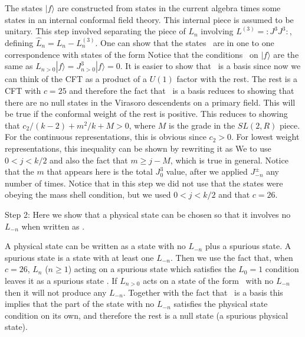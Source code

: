 The states
 $|f\rangle$ are constructed from states in the current algebra times
some states in an internal conformal field theory. This internal piece is
assumed to be unitary.
This step involved separating  the piece of $L_n$ involving $L^{(3)}
= :J^3J^3:$, defining $ \hat L_n = L_n - L^{(3)}_n $.
One can show that the states \basis\ are in one to one correspondence
with states of the form 
Notice that the conditions \basis\ on $|f\rangle$ are the 
same as $ \hat L_{n>0} |f \rangle = J^3_{n>0} |f \rangle =0$.
It is easier to show that \basisnew\ is a basis since now we can
think of the CFT as a product of a $U(1)$ factor with the rest.
The rest is a CFT with $c=25$ and therefore the fact that 
\basisnew\ is a basis reduces to showing that there are no 
null states in the Virasoro descendents on a primary field. 
This will be true if the conformal weight of the rest is positive.  
This  reduces to showing that
 $c_2/(k-2) + m^2/k +M >0$, where $M$ is the grade in the $SL(2,R)$ piece.
 For the continuous representations, this is
obvious since $c_2>0$. For lowest weight representations,
this inequality can be shown by rewriting it as
We to use $0<j<k/2$ 
and also the fact that $m\geq j-M$, which is true
in general.
 Notice that the $m$ that
appears here is the total $J_0^3$ value, after we applied $J^\pm_{-n}$ 
any number of times. 
Notice that in this step we did not use that the states were obeying
the mass shell condition, but we used $0<j<k/2$ and that $c=26$. 


\medskip
\noindent
Step 2: Here we show that a physical state can be chosen so that
it involves no $L_{-n}$ when written as \basis . 

 A physical state can be written as a state with no $L_{-n} $  plus
a spurious state. A spurious state is a state with at least one $L_{-n}$.
Then we use the fact that, when $c=26$,  $L_n$ ($n\geq 1$)  acting on
  a spurious state which
satisfies the $L_0=1$ condition leaves it as a spurious state
\cite{Brower:1972wj,Goddard:1972iy} .
If $L_{n>0}$ acts on a state of the form \basis\ with no $L_{-n}$ 
then it will not produce any $L_{-n}$. Together with
the fact that \basis\ is a basis this implies that 
the part of the state with no $L_{-n}$ satisfies the physical state
condition on its own, and therefore the rest is a null state (a spurious
physical state). 


